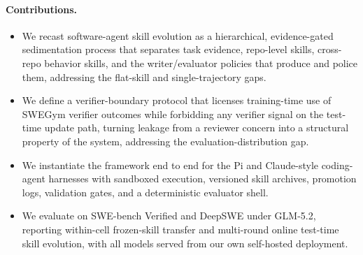 \paragraph{Contributions.}
\begin{itemize}
    \item We recast software-agent skill evolution as a hierarchical,
    evidence-gated sedimentation process that separates task evidence,
    repo-level skills, cross-repo behavior skills, and the writer/evaluator
    policies that produce and police them, addressing the flat-skill and
    single-trajectory gaps.
    \item We define a verifier-boundary protocol that licenses training-time
    use of SWEGym verifier outcomes while forbidding any verifier signal on
    the test-time update path, turning leakage from a reviewer concern into a
    structural property of the system, addressing the evaluation-distribution
    gap.
    \item We instantiate the framework end to end for the Pi and Claude-style
    coding-agent harnesses with sandboxed execution, versioned skill archives,
    promotion logs, validation gates, and a deterministic evaluator shell.
    \item We evaluate on SWE-bench Verified and DeepSWE under GLM-5.2,
    reporting within-cell frozen-skill transfer and multi-round online
    test-time skill evolution, with all models served from our own
    self-hosted deployment.
\end{itemize}
